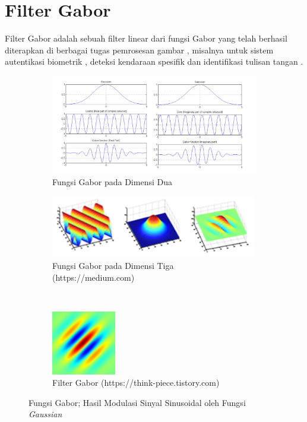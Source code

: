 \section{Filter Gabor}
Filter Gabor adalah sebuah filter linear dari fungsi Gabor yang telah berhasil diterapkan di berbagai tugas pemrosesan gambar , misalnya untuk sistem autentikasi biometrik , deteksi kendaraan spesifik  dan identifikasi tulisan tangan .

\begin{figure}[t]
    \centering
    \begin{subfigure}[t]{12cm}
        \includegraphics[width=12cm]{gambar/gabor2d.png}
        \caption[Fungsi Gabor pada Dimensi Dua]{Fungsi Gabor pada Dimensi Dua \protect{}}
    \end{subfigure}
    \begin{subfigure}[t]{9cm}
        \includegraphics[width=9cm]{gambar/gabor3d.png}
        \caption[Fungsi Gabor pada Dimensi Tiga]{Fungsi Gabor pada Dimensi Tiga (https://medium.com)}
    \end{subfigure}
    ~~~
    \begin{subfigure}[t]{2.8cm}
        \includegraphics[width=2.8cm]{gambar/filter_gabor.jpg}
        \caption[Filter Gabor]{Filter Gabor (https://think-piece.tistory.com)}
    \end{subfigure}
    \caption[Fungsi Gabor; Hasil Modulasi Sinyal Sinusoidal oleh Fungsi \textit{Gaussian}]{Fungsi Gabor; Hasil Modulasi Sinyal Sinusoidal oleh Fungsi \textit{Gaussian}}
    \label{fig:fungsigabor}
\end{figure}
